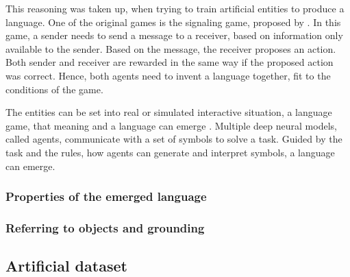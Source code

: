 This reasoning was taken up, when trying to train artificial entities to produce a language.
One of the original games is the signaling game, proposed by \citet{Lewis1969}.
In this game, a sender needs to send a message to a receiver, based on information only available to the sender.
Based on the message, the receiver proposes an action.
Both sender and receiver are rewarded in the same way if the proposed action was correct.
Hence, both agents need to invent a language together, fit to the conditions of the game.

The entities can be set into real or simulated interactive situation, a language game, that meaning and a language can emerge \citep{Kirby2002}.
Multiple deep neural models, called agents, communicate with a set of symbols to solve a task.
Guided by the task and the rules, how agents can generate and interpret symbols, a language can emerge.


\subsubsection{Properties of the emerged language}
\label{sec:properties-el}


\subsubsection{Referring to objects and grounding}
\label{sec:referring}

\subsection{Artificial dataset}
